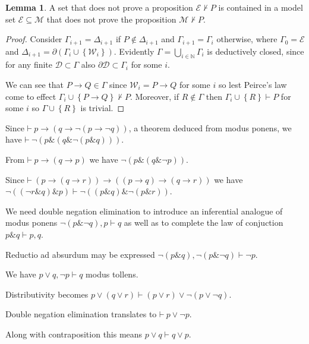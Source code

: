 \documentclass{amsbook}
\newcommand{\setsm}[1]{\left\{#1\right\}}
\newcommand{\wffs}{\mathcal W}
\newcommand{\infers}{\mathrel\vdash}
\newcommand{\theorem}{\mathord\vdash\medspace}
\newcommand{\then}{\mathrel\rightarrow}
\newcommand{\conj}{\mathrel\&}
\newcommand{\disj}{\mathrel\vee}
\theoremstyle{definition}
\newtheorem{lmm}{Lemma}[section]
\begin{document}
\begin{lmm}
    A set that does not prove a proposition $\mathcal E \nvdash P$ is contained in a model set $\mathcal E \subseteq \mathcal M$ that does not prove the proposition $\mathcal M \nvdash P$.
    \begin{proof}
        Consider $\Gamma_{i+1} = \Delta_{i+1}$ if $P \notin \Delta_{i+1}$ and $\Gamma_{i+1} = \Gamma_i$ otherwise, where $\Gamma_0 = \mathcal E$ and $\Delta_{i+1} = \partial(\Gamma_i \cup \setsm {\wffs_i})$.
        Evidently $\Gamma = \bigcup_{i \in \mathbb N} \Gamma_i$ is deductively closed, since for any finite $\mathcal D \subset \Gamma$ also $\partial\mathcal D \subset \Gamma_i$ for some $i$.

        We can see that $P \then Q \in \Gamma$ since $\wffs_i = P \then Q$ for some $i$ so lest Peirce's law come to effect $\Gamma_i \cup \setsm{P \then Q} \nvdash P$. Moreover, if $R \notin \Gamma$ then $\Gamma_i \cup \setsm R \infers P$ for some $i$ so $\Gamma \cup \setsm R$ is trivial.
    \end{proof}
\end{lmm}


\newpage

Since $\theorem p \then (q \then \neg(p \then \neg q))$, a theorem deduced from modus ponens, we have $\theorem \neg(p \conj (q \conj \neg(p \conj q)))$.

From $\theorem p \then (q \then p)$ we have $\neg(p \conj (q \conj \neg p)) $.

Since $\theorem (p \then (q \then r)) \then ((p \then q) \then (q \then r))$ we have $\neg((\neg r \conj q) \conj p) \infers \neg((p \conj q) \conj \neg(p \conj r))$.

We need double negation elimination to introduce an inferential analogue of modus ponens $\neg(p \conj \neg q), p \infers q$ as well as to complete the law of conjuction $p \conj q \infers p, q$.

Reductio ad absurdum may be expressed $\neg(p \conj q), \neg(p \conj \neg q) \infers \neg p$.



We have $p \disj q, \neg p \infers q$ modus tollens.

Distributivity becomes $p \disj (q \disj r) \infers (p \disj r) \disj \neg(p \disj \neg q)$.

Double negation elimination translates to $\theorem p \disj \neg p$.

Along with contraposition this means $p \disj q \infers q \disj p$.
\end{document}
